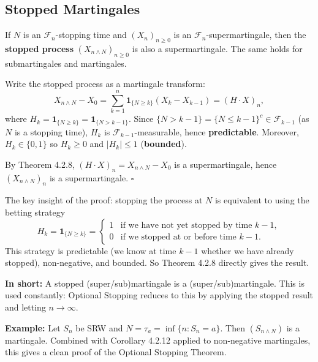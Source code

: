 \documentclass[12pt]{article}
\newcommand{\F}{\mathcal{F}}
\newcommand{\1}{\mathbf{1}}
\begin{document}
\subsection{Stopped Martingales}

\begin{tcolorbox}[redbox={Theorem 4.2.9 (Stopping Preserves the Martingale Property)}]
If $N$ is an $\F_n$-stopping time and $(X_n)_{n \ge 0}$ is an $\F_n$-supermartingale,
then the \textbf{stopped process} $(X_{n \wedge N})_{n \ge 0}$ is also a supermartingale.
The same holds for submartingales and martingales.
\end{tcolorbox}

\begin{tcolorbox}[redbox={Proof of Theorem 4.2.9}]
Write the stopped process as a martingale transform:
\[
  X_{n \wedge N} - X_0
  = \sum_{k=1}^n \1_{\{N \ge k\}}(X_k - X_{k-1})
  = (H \cdot X)_n,
\]
where $H_k = \1_{\{N \ge k\}} = \1_{\{N > k-1\}}$.  Since $\{N > k-1\} = \{N \le k-1\}^c
\in \F_{k-1}$ (as $N$ is a stopping time), $H_k$ is $\F_{k-1}$-measurable, hence
\textbf{predictable}.  Moreover, $H_k \in \{0,1\}$ so $H_k \ge 0$ and $|H_k| \le 1$
(\textbf{bounded}).

By Theorem 4.2.8, $(H \cdot X)_n = X_{n \wedge N} - X_0$ is a supermartingale,
hence $(X_{n \wedge N})_n$ is a supermartingale. \hfill$\square$
\end{tcolorbox}

\begin{tcolorbox}[bluebox={Intuition: Stopping is a Special Betting Strategy}]
The key insight of the proof: stopping the process at $N$ is equivalent to using the
betting strategy
\[
  H_k = \1_{\{N \ge k\}} =
  \begin{cases} 1 & \text{if we have not yet stopped by time } k-1, \\ 0 & \text{if we stopped at or before time } k-1. \end{cases}
\]
This strategy is predictable (we know at time $k-1$ whether we have already stopped),
non-negative, and bounded.  So Theorem 4.2.8 directly gives the result.

\medskip
\textbf{In short:} A stopped (super/sub)martingale is a (super/sub)martingale.
This is used constantly: Optional Stopping reduces to this by applying the stopped
result and letting $n \to \infty$.

\medskip
\textbf{Example:}  Let $S_n$ be SRW and $N = \tau_a = \inf\{n: S_n = a\}$.  Then
$(S_{n \wedge N})$ is a martingale.  Combined with Corollary 4.2.12 applied to
non-negative martingales, this gives a clean proof of the Optional Stopping Theorem.
\end{tcolorbox}
\end{document}

